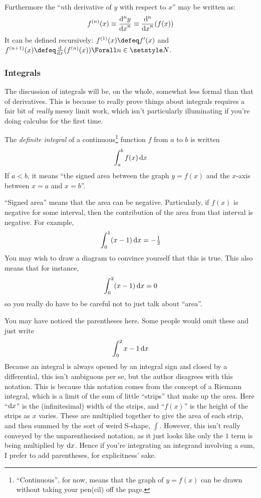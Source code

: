Furthermore the ``\(n\)th derivative of \(y\) with respect to \(x\)'' may be
written as:
\begin{equation*}
 f^{(n)}(x)
 \equiv \dv[n]<y>{x}
 \equiv \dv[n]{x}(f(x))
\end{equation*}
It can be defined recursively: \(f^{(1)}(x) \defeq f'(x)\) and
\(f^{(n + 1)}(x) \defeq \dv{x}(f^{(n)}(x)) \Forall n \in \Naturals\).

\subsubsection{Integrals}

The discussion of integrals will be, on the whole, somewhat less formal than
that of derivatives. This is because to really prove things about integrals
requires a fair bit of \emph{really} messy limit work, which isn't particularly
illuminating if you're doing calculus for the first time.

The \emph{definite integral} of a continuous\footnote{
 ``Continuous'', for now, means that the graph of \(y = f(x)\) can be drawn
 without taking your pen(cil) off the page.
} function \(f\) from \(a\) to \(b\)
is written
\begin{equation*}
 \integ[a]<b>{f(x)}{x}
\end{equation*}
If \(a < b\), it means ``the signed area between the graph \(y = f(x)\) and the
\(x\)-axis between \(x = a\) and \(x = b\)''.

``Signed area'' means that the area can be negative. Particularly, if \(f(x)\)
is negative for some interval, then the contribution of the area from that
interval is negative. For example,
\begin{equation*}
 \integ[0]<1>{(x - 1)}{x} = -\tfrac 12
\end{equation*}
You may wish to draw a diagram to convince yourself that this is true. This also
means that for instance,
\begin{equation*}
 \integ[0]<2>{(x - 1)}{x} = 0
\end{equation*}
so you really do have to be careful not to just talk about ``area''.

You may have noticed the parentheses here. Some people would omit these and just
write
\begin{equation*}
 \integ[0]<2>{x - 1}{x}
\end{equation*}
Because an integral is always opened by an integral sign and closed by a
differential, this isn't ambiguous per se, but the author disagrees with this
notation. This is because this notation comes from the concept of a Riemann
integral, which is a limit of the sum of little ``strips'' that make up the
area. Here ``\(\mathrm d x\)'' is the (infinitesimal) width of the strips, and
``\(f(x)\)'' is the height of the strips as \(x\) varies. These are multiplied
together to give the area of each strip, and then summed by the sort of weird
S-shape, \(\int\). However, this isn't really conveyed by the unparenthesised
notation, as it just looks like only the \(1\) term is being multiplied by
\(\mathrm d x\). Hence if you're integrating an integrand involving a sum, I prefer
to add parentheses, for explicitness' sake.

